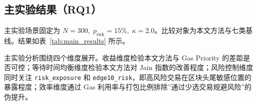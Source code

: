 \subsection{主实验结果（RQ1）}

主实验场景固定为 $N{=}300,\;p_{\text{risk}}{=}15\%,\;\kappa{=}2.0$。比较对象为本文方法与七类基线。结果如表~\ref{tab:main_results} 所示。


\begin{table}[htbp]
\centering
\caption{主实验结果（$N{=}300,\;p_{\text{risk}}{=}15\%$）}
\label{tab:main_results}
\end{table}

主实验分析围绕四个维度展开。收益维度检验本文方法与 Gas Priority 的差距是否可控；等待时间均衡维度检验本文方法对 Jain 指数的改善程度；风险控制维度同时关注 \texttt{risk\_exposure} 和 \texttt{edge10\_risk}，即高风险交易在区块头尾敏感位置的暴露程度；效率维度通过 Gas 利用率与打包比例排除”通过少选交易规避风险”的伪提升。

